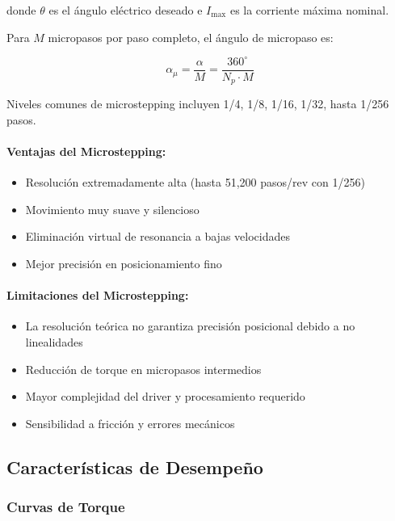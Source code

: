 donde $\theta$ es el ángulo eléctrico deseado e $I_{\max}$ es la corriente máxima nominal.

Para $M$ micropasos por paso completo, el ángulo de micropaso es:

\begin{equation}
\alpha_{\mu} = \frac{\alpha}{M} = \frac{360^\circ}{N_p \cdot M}
\end{equation}

Niveles comunes de microstepping incluyen 1/4, 1/8, 1/16, 1/32, hasta 1/256 pasos.

\paragraph{Ventajas del Microstepping:}

\begin{itemize}
    \item Resolución extremadamente alta (hasta 51,200 pasos/rev con 1/256)
    \item Movimiento muy suave y silencioso
    \item Eliminación virtual de resonancia a bajas velocidades
    \item Mejor precisión en posicionamiento fino
\end{itemize}

\paragraph{Limitaciones del Microstepping:}

\begin{itemize}
    \item La resolución teórica no garantiza precisión posicional debido a no linealidades
    \item Reducción de torque en micropasos intermedios
    \item Mayor complejidad del driver y procesamiento requerido
    \item Sensibilidad a fricción y errores mecánicos
\end{itemize}

\subsection{Características de Desempeño}

\subsubsection{Curvas de Torque}

